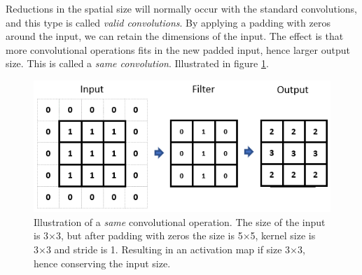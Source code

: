     
    Reductions in the spatial size\cite{o2015introduction_convolutions} will normally occur with the standard convolutions, and this type is called \textit{valid convolutions}. By applying a padding with zeros around the input, we can retain the dimensions of the input. The effect is that more convolutional operations fits in the new padded input, hence larger output size. This is called a \textit{same convolution}. Illustrated in figure \ref{same_convolutional_fig}.
    
    \begin{figure}[H]
        \centering
        \includegraphics[scale=0.6]{figures/same_convolutions.png}
        \caption[Same convolution example]{Illustration of a \textit{same} convolutional operation. The size of the input is 3×3, but after padding with zeros the size is 5×5, kernel size is 3×3 and stride is 1. Resulting in an activation map if size 3×3, hence conserving the input size.}
      	\medskip 
        \label{same_convolutional_fig}
    \end{figure}
    
